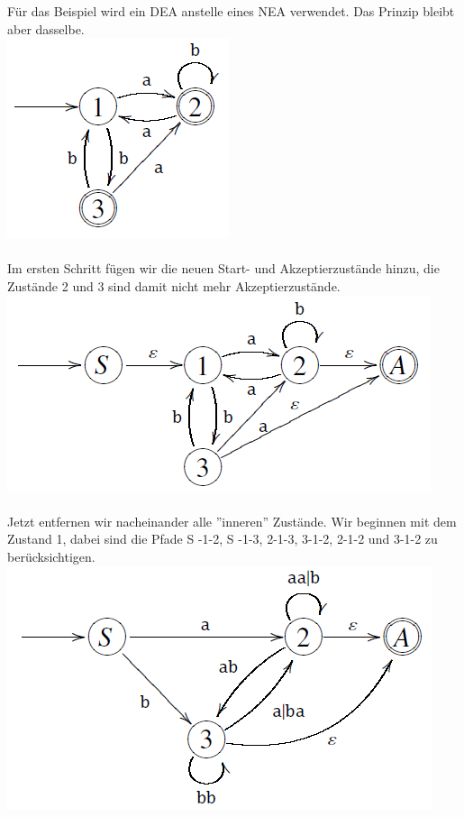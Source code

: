 \documentclass[a4paper]{article}
\begin{document}
	\begin{falgo}[Beispiel]
		Für das Beispiel wird ein DEA anstelle eines NEA verwendet. Das Prinzip bleibt aber dasselbe. \\		
		\includegraphics[scale=0.6]{vnea_beispiel_1.png} \\
		\\
		Im ersten Schritt fügen wir die neuen Start- und Akzeptierzustände hinzu, die Zustände 2 und 3 sind damit nicht mehr Akzeptierzustände. \\
		\includegraphics[scale=0.6]{vnea_beispiel_2.png} \\
		\\
		Jetzt entfernen wir nacheinander alle ''inneren'' Zustände. Wir beginnen mit dem Zustand 1, dabei sind die Pfade S -1-2, S -1-3, 2-1-3, 3-1-2, 2-1-2 und 3-1-2 zu
berücksichtigen. \\
		\includegraphics[scale=0.6]{vnea_beispiel_3.png} \\

\end{falgo}
\end{document}
